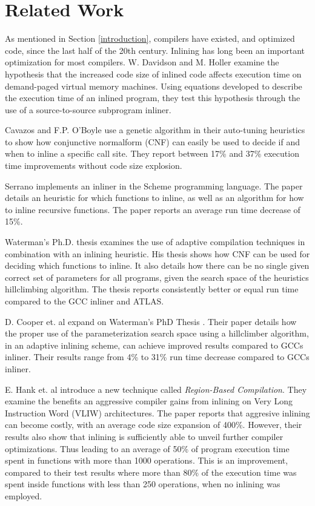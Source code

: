 
\clearpage
\section{Related Work}

As mentioned in Section \ref{introduction}, compilers have existed, and
optimized code, since the last half of the 20th century. Inlining has long been
an important optimization for most compilers. W. Davidson and M. Holler
\cite{SubprogInlining} examine the hypothesis that the increased code size of
inlined code affects execution time on demand-paged virtual memory machines.
Using equations developed to describe the execution time of an inlined program,
they test this hypothesis through the use of a source-to-source subprogram
inliner.

Cavazos and F.P. O'Boyle \cite{AutoTuningJavaHeuristics} use a genetic algorithm
in their auto-tuning heuristics to show how conjunctive normalform (CNF) can
easily be used to decide if and when to inline a specific call site. They report
between 17\% and 37\% execution time improvements without code size explosion.

Serrano \cite{InlineWhenHowSerrano} implements an inliner in the Scheme
programming language. The paper details an heuristic for which functions to
inline, as well as an algorithm for how to inline recursive functions. The paper
reports an average run time decrease of 15\%.

Waterman's Ph.D. thesis \cite{AdaptvCompilAndInlingWaterman} examines the use of
adaptive compilation techniques in combination with an inlining heuristic. His
thesis shows how CNF can be used for deciding which functions to inline. It also
details how there can be no single given correct set of parameters for all
programs, given the search space of the heuristics hillclimbing algorithm. The
thesis reports consistently better or equal run time compared to the GCC inliner
and ATLAS.

D. Cooper et. al \cite{AdaptvStratInlSubst} expand on Waterman's PhD Thesis
\cite{AdaptvCompilAndInlingWaterman}. Their paper details how the proper use of
the parameterization search space using a hillclimber algorithm, in an adaptive
inlining scheme, can achieve improved results compared to GCCs inliner. Their
results range from 4\% to 31\% run time decrease compared to GCCs inliner.

E. Hank et. al \cite{RegionBasedCompilationIntroduction} introduce a new
technique called \textit{Region-Based Compilation}. They examine the benefits an
aggressive compiler gains from inlining on Very Long Instruction Word (VLIW)
architectures. The paper reports that aggresive inlining can become costly, with
an average code size expansion of 400\%. However, their results also show that
inlining is sufficiently able to unveil further compiler optimizations. Thus
leading to an average of 50\% of program execution time spent in functions with
more than 1000 operations. This is an improvement, compared to their test
results where more than 80\% of the execution time was spent inside functions
with less than 250 operations, when no inlining was employed.

